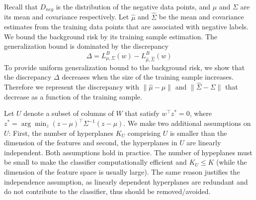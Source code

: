 \documentclass[twoside,11pt]{article}
\begin{document}
Recall that $D_{neg}$ is the distribution of the negative data points, and $\mu$ and $\Sigma$ are its mean and covariance respectively. Let $\hat \mu$ and $\hat \Sigma$ be the mean and covariance estimates from the training data points that are associated with negative labels. We bound the background risk by its training sample estimation. The  generalization bound is dominated by the discrepancy
\begin{equation*}
\Delta=L^{B}_{\mu,\Sigma}(w) - L^{B}_{\hat \mu, \hat \Sigma}(w)
\end{equation*}
To provide uniform generalization bound to the background risk, we show that the discrepancy $\Delta$ decreases when the size of the training sample increases. Therefore we represent the discrepancy with $\|\hat \mu - \mu\|$ and $\|\hat \Sigma - \Sigma\|$ that decrease as a function of the training sample.

Let $U$ denote a subset of columns of $W$ that satisfy $w^\top z^*=0$, where $z^*=\arg\min_z(z-\mu)^\top \Sigma^{-1}(z-\mu)$. We make two additional assumptions on $U$: First, the number of hyperplanes $K_U$ comprising $U$ is smaller than the dimension of the features and second, the  hyperplanes in $U$ are linearly independent. Both assumptions hold in practice. The number of hypeplanes must be  small to make the classifier computationally efficient and $K_U\leq K$ (while the dimension of the feature space is usually large). The same reason justifies the independence assumption, as linearly dependent hyperplanes are redundant and do not contribute to the classifier, thus should be removed/avoided.
\end{document}
